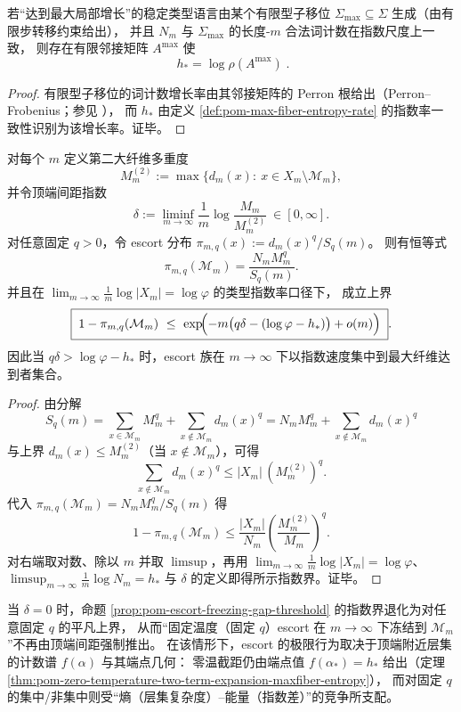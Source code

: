 \begin{corollary}[最大纤维子移位的谱公式]\label{cor:pom-max-fiber-subshift-spectral-entropy}
若“达到最大局部增长”的稳定类型语言由某个有限型子移位 \(\Sigma_{\max}\subseteq\Sigma\) 生成（由有限步转移约束给出），
并且 \(N_m\) 与 \(\Sigma_{\max}\) 的长度-\(m\) 合法词计数在指数尺度上一致，
则存在有限邻接矩阵 \(A^{\max}\) 使
\[
\boxed{\;
h_\ast=\log\rho(A^{\max})\; }.
\]
\end{corollary}
\begin{proof}
有限型子移位的词计数增长率由其邻接矩阵的 Perron 根给出（Perron--Frobenius；参见 \cite{LindMarcus1995}），
而 \(h_\ast\) 由定义 \ref{def:pom-max-fiber-entropy-rate} 的指数率一致性识别为该增长率。证毕。
\end{proof}

\begin{proposition}\label{prop:pom-escort-freezing-gap-threshold}
对每个 \(m\) 定义第二大纤维多重度
\[
M_m^{(2)}:=\max\{d_m(x):\ x\in X_m\setminus\mathcal{M}_m\},
\]
并令顶端间距指数
\[
\delta:=\liminf_{m\to\infty}\frac{1}{m}\log\frac{M_m}{M_m^{(2)}}\ \in[0,\infty].
\]
对任意固定 \(q>0\)，令 escort 分布 \(\pi_{m,q}(x):=d_m(x)^q/S_q(m)\)。
则有恒等式
\[
\pi_{m,q}(\mathcal{M}_m)=\frac{N_m M_m^q}{S_q(m)}.
\]
并且在 \(\lim_{m\to\infty}\frac{1}{m}\log|X_m|=\log\varphi\) 的类型指数率口径下，
成立上界
\[
\boxed{\;
1-\pi_{m,q}(\mathcal{M}_m)
\ \le\
\exp\!\Bigl(-m\bigl(q\delta-(\log\varphi-h_\ast)\bigr)+o(m)\Bigr)\; }.
\]
因此当 \(q\delta>\log\varphi-h_\ast\) 时，escort 族在 \(m\to\infty\) 下以指数速度集中到最大纤维达到者集合。
\end{proposition}
\begin{proof}
由分解
\[
S_q(m)=\sum_{x\in\mathcal{M}_m}M_m^q+\sum_{x\notin\mathcal{M}_m}d_m(x)^q
=N_m M_m^q+\sum_{x\notin\mathcal{M}_m}d_m(x)^q
\]
与上界 \(d_m(x)\le M_m^{(2)}\)（当 \(x\notin\mathcal{M}_m\)），可得
\[
\sum_{x\notin\mathcal{M}_m}d_m(x)^q\le |X_m|\,(M_m^{(2)})^q.
\]
代入 \(\pi_{m,q}(\mathcal{M}_m)=N_mM_m^q/S_q(m)\) 得
\[
1-\pi_{m,q}(\mathcal{M}_m)
\le
\frac{|X_m|}{N_m}\left(\frac{M_m^{(2)}}{M_m}\right)^q.
\]
对右端取对数、除以 \(m\) 并取 \(\limsup\)，再用
\(
\lim_{m\to\infty}\frac{1}{m}\log|X_m|=\log\varphi
\)、
\(
\limsup_{m\to\infty}\frac{1}{m}\log N_m=h_\ast
\)
与 \(\delta\) 的定义即得所示指数界。证毕。
\end{proof}

\begin{remark}\label{rem:pom-top-gap-degenerate-flat-top}
当 \(\delta=0\) 时，命题 \ref{prop:pom-escort-freezing-gap-threshold} 的指数界退化为对任意固定 \(q\) 的平凡上界，
从而“固定温度（固定 \(q\)）escort 在 \(m\to\infty\) 下冻结到 \(\mathcal{M}_m\)”不再由顶端间距强制推出。
在该情形下，escort 的极限行为取决于顶端附近层集的计数谱 \(f(\alpha)\) 与其端点几何：
零温截距仍由端点值 \(f(\alpha_\ast)=h_\ast\) 给出（定理 \ref{thm:pom-zero-temperature-two-term-expansion-maxfiber-entropy}），
而对固定 \(q\) 的集中/非集中则受“熵（层集复杂度）--能量（指数差）”的竞争所支配。
\end{remark}





